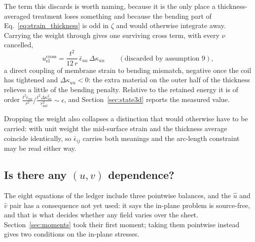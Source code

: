 \documentclass[11pt]{article}
\begin{document}
The term this discards is worth naming, because it is the only place a
thickness-averaged treatment loses something and because the bending part of
Eq.~\eqref{eq:strain_thickness} is odd in $\zeta$ and would otherwise integrate
away. Carrying the weight through gives one surviving cross term, with every
$\nu$ cancelled,
\begin{equation}\label{eq:jacobian_cross}
    u_{\mathrm{el}}^{\mathrm{cross}}
      = \frac{t^{2}}{12\,r}\,\bar\epsilon_{uu}\,\Delta\kappa_{uu}
      \qquad\left(\text{discarded by assumption 9}\right),
\end{equation}
a direct coupling of membrane strain to bending mismatch, negative once the coil
has tightened and $\Delta\kappa_{uu}<0$: the extra material on the outer half of
the thickness relieves a little of the bending penalty. Relative to the retained
energy it is of order $\frac{t^{2}\bar\epsilon_{uu}}{r^{2}}
\big/\frac{t^{2}\Delta\kappa_{uu}^{2}}{r_{\mathrm{nat}}^{2}}
\sim \epsilon$, and Section~\ref{sec:state3d} reports the measured value.

Dropping the weight also collapses a distinction that would otherwise have to be
carried: with unit weight the mid-surface strain and the thickness average
coincide identically, so $\bar\epsilon_{ij}$ carries both meanings and the
arc-length constraint may be read either way.

\subsection{Is there any \texorpdfstring{$(u,v)$}{(u,v)} dependence?}\label{sec:uv}
The eight equations of the ledger include three pointwise balances, and the
$\hat u$ and $\hat v$ pair has a consequence not yet used: it says the in-plane
problem is source-free, and that is what decides whether any field varies over
the sheet.  Section~\ref{sec:moments} took their first moment; taking them
pointwise instead gives two conditions on the in-plane stresses.
\end{document}
